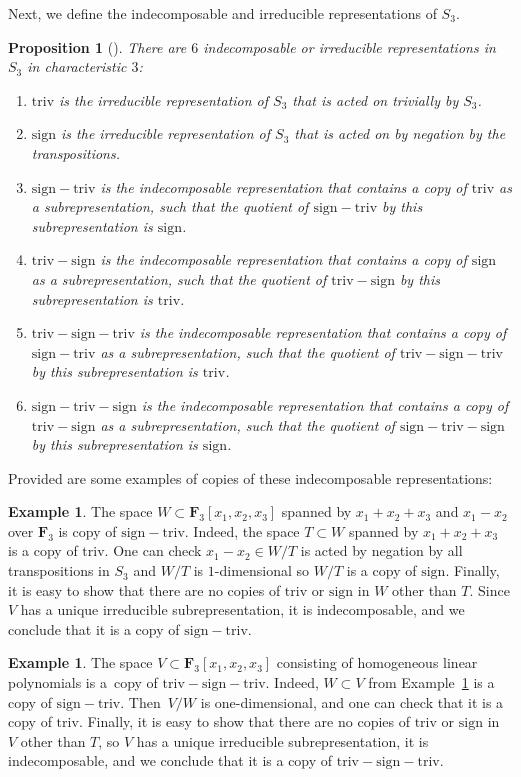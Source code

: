\documentclass[11pt]{article}
\numberwithin{equation}{section}
\newtheorem{Proposition}[Theorem]{Proposition}
\theoremstyle{definition}
\newtheorem{Example}[Theorem]{Example}
\numberwithin{equation}{section}
\newcommand{\F}{\mathbf{F}}
\newcommand{\triv}{\mathrm{triv}}
\newcommand{\sign}{\mathrm{sign}}
\newcommand{\trix}{\mathrm{triv-sign-triv}}
\newcommand{\six}{\mathrm{sign-triv-sign}}
\newcommand{\siv}{\mathrm{sign-triv}}
\newcommand{\tign}{\mathrm{triv-sign}}
\begin{document}
Next, we define the indecomposable and irreducible representations of $S_3$.

\begin{Proposition}[\cite{Alperin_1986}]
 There are $6$ indecomposable or irreducible representations in $S_3$ in characteristic $3$:
 \begin{enumerate}\itemsep=0pt
 \item[$1$.] $\triv$ is the irreducible representation of $S_3$ that is acted on trivially by $S_3$.
 \item[$2$.] $\sign$ is the irreducible representation of $S_3$ that is acted on by negation by the transpositions.
 \item[$3$.] $\siv$ is the indecomposable representation that contains a copy of $\triv$ as a subrepresentation, such that the quotient of $\siv$ by this subrepresentation is $\sign$.
 \item[$4$.] $\tign$ is the indecomposable representation that contains a copy of $\sign$ as a subrepresentation, such that the quotient of $\tign$ by this subrepresentation is $\triv$.
 \item[$5$.] $\trix$ is the indecomposable representation that contains a copy of $\siv$ as a subrepresentation, such that the quotient of $\trix$ by this subrepresentation is $\triv$.
 \item[$6$.] $\six$ is the indecomposable representation that contains a copy of $\tign$ as a subrepresentation, such that the quotient of $\six$ by this subrepresentation is $\sign$.
 \end{enumerate}
\end{Proposition}

Provided are some examples of copies of these indecomposable representations:

\begin{Example}\label{exSiv}
 The space $W\subset\F_3[x_1,x_2,x_3]$ spanned by $x_1+x_2+x_3$ and $x_1-x_2$ over $\mathbf{F}_3$ is copy of $\siv$. Indeed, the space $T\subset W$ spanned by $x_1+x_2+x_3$ is a copy of $\triv$. One can check $x_1-x_2\in W/T$ is acted by negation by all transpositions in $S_3$ and $W/T$ is $1$-dimensional so $W/T$ is a copy of $\sign$. Finally, it is easy to show that there are no copies of $\triv$ or $\sign$ in $W$ other than $T$. Since $V$ has a unique irreducible subrepresentation, it is indecomposable, and we conclude that it is a copy of $\siv$.
\end{Example}

\begin{Example}\label{deg1polys}
 The space $V\subset\F_3[x_1,x_2,x_3]$ consisting of homogeneous linear polynomials is a~copy of $\trix$. Indeed, $W\subset V$ from Example~\ref{exSiv} is a copy of $\siv$. Then~$V/W$ is one-dimensional, and one can check that it is a copy of $\triv$. Finally, it is easy to show that there are no copies of $\triv$ or $\sign$ in $V$ other than $T$, so $V$ has a unique irreducible subrepresentation, it is indecomposable, and we conclude that it is a copy of $\trix$.
\end{Example}
\end{document}
